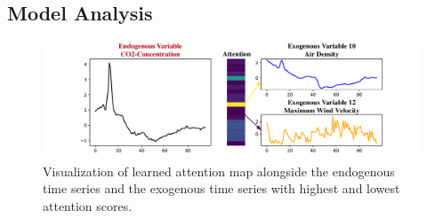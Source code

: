 \documentclass[nohyperref]{article}
\theoremstyle{plain}
\theoremstyle{definition}
\theoremstyle{remark}
\begin{document}
\begin{table}[h]
\centering
\vspace{-10pt}
\caption{Ablation Results. \emph{Ex.} and \emph{En.} are abbreviations for Exogenous variable and Endogenous variable. \emph{T} and \emph{V} denote temporal token and variate token respectively. Results are averaged from all prediction lengths. Full results are listed in the Appendix.}
\vspace{5pt}
\setlength{\tabcolsep}{2.5pt}
\renewcommand{\arraystretch}{1.2}
\begin{sc}
\end{sc}
\label{tab:abalation}
\end{table}


\subsection{Model Analysis}
\begin{figure}[h]
    \centering
    \includegraphics[width=\linewidth]{fig/visv3.pdf}
    \vspace{-10pt}
    \caption{Visualization of learned attention map alongside the endogenous time series and the exogenous time series with highest and lowest attention scores.}
    \vspace{-10pt}
    \label{fig:attn-vis}
\end{figure}
\end{document}
